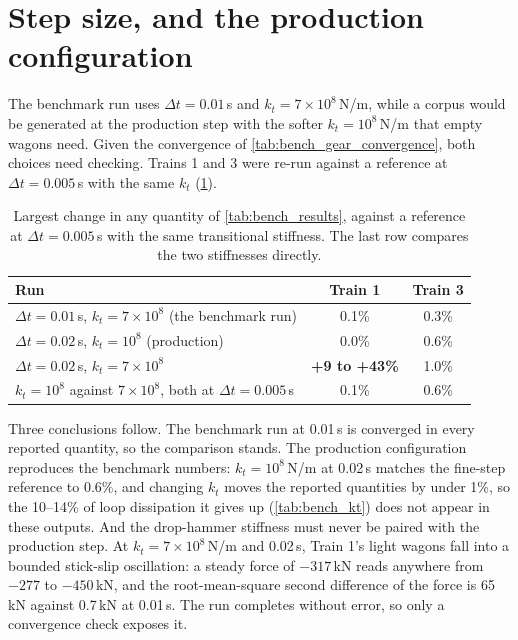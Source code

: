 \section{Step size, and the production configuration}
\label{sec:bench_step}

The benchmark run uses $\Delta t = 0.01$\,s and $k_t = 7\times10^{8}$\,N/m, while a corpus would be generated at the production step with the softer $k_t = 10^{8}$\,N/m that empty wagons need. Given the convergence of \cref{tab:bench_gear_convergence}, both choices need checking. Trains 1 and 3 were re-run against a reference at $\Delta t = 0.005$\,s with the same $k_t$ (\cref{tab:bench_step}).

\begin{table}[htbp]
    \centering
    \small
    \begin{tabular}{lcc}
        \toprule
        Run & Train 1 & Train 3 \\
        \midrule
        $\Delta t = 0.01$\,s, $k_t = 7\times10^{8}$ (the benchmark run) & 0.1\% & 0.3\% \\
        $\Delta t = 0.02$\,s, $k_t = 10^{8}$ (production) & 0.0\% & 0.6\% \\
        $\Delta t = 0.02$\,s, $k_t = 7\times10^{8}$ & \textbf{+9 to +43\%} & 1.0\% \\
        $k_t = 10^{8}$ against $7\times10^{8}$, both at $\Delta t = 0.005$\,s & 0.1\% & 0.6\% \\
        \bottomrule
    \end{tabular}
    \caption{Largest change in any quantity of \cref{tab:bench_results}, against a reference at $\Delta t = 0.005$\,s with the same transitional stiffness. The last row compares the two stiffnesses directly.}
    \label{tab:bench_step}
\end{table}

Three conclusions follow. The benchmark run at 0.01\,s is converged in every reported quantity, so the comparison stands. The production configuration reproduces the benchmark numbers: $k_t = 10^{8}$\,N/m at 0.02\,s matches the fine-step reference to 0.6\%, and changing $k_t$ moves the reported quantities by under 1\%, so the 10--14\% of loop dissipation it gives up (\cref{tab:bench_kt}) does not appear in these outputs. And the drop-hammer stiffness must never be paired with the production step. At $k_t = 7\times10^{8}$\,N/m and 0.02\,s, Train 1's light wagons fall into a bounded stick-slip oscillation: a steady force of $-317$\,kN reads anywhere from $-277$ to $-450$\,kN, and the root-mean-square second difference of the force is 65\,kN against 0.7\,kN at 0.01\,s. The run completes without error, so only a convergence check exposes it.

